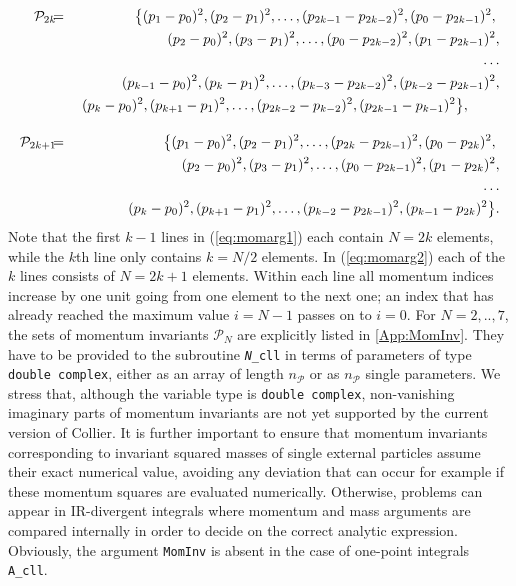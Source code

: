\documentclass[preprint,sort&compress,12pt]{elsarticle}
\def\refeq#1{\mbox{(\ref{#1})}}
\newcommand{\collier}{{\sc Collier}}
\begin{document}
\begin{eqnarray}
  \mathcal{P}_{2k}\!\!\!&=&\!\!\!\left\{ (p_1-p_0)^2,(p_2-p_1)^2,\ldots,(p_{2k-1}-p_{2k-2})^2,
                                     (p_0-p_{2k-1})^2,\right.\nonumber\\
               &&\,(p_2-p_0)^2,(p_3-p_1)^2,\ldots,(p_0-p_{2k-2})^2,(p_1-p_{2k-1})^2,\nonumber\\
               &&\;\;\;\ldots\nonumber\\
               &&\,(p_{k-1}-p_0)^2,(p_k-p_1)^2,\ldots,(p_{k-3}-p_{2k-2})^2,(p_{k-2}-p_{2k-1})^2,\nonumber\\               
               &&\,\left.(p_{k}-p_0)^2,(p_{k+1}-p_1)^2,\ldots,(p_{2k-2}-p_{k-2})^2,(p_{2k-1}-p_{k-1})^2\right\}\!,\hspace{0.8cm}\label{eq:momarg1}\\[1em]
  \mathcal{P}_{2k+1}\!\!\!&=&\!\!\!\left\{ (p_1-p_0)^2,(p_2-p_1)^2,\ldots,(p_{2k}-p_{2k-1})^2,
                                     (p_0-p_{2k})^2,\right.\nonumber\\
               &&\,(p_2-p_0)^2,(p_3-p_1)^2,\ldots,(p_0-p_{2k-1})^2,(p_1-p_{2k})^2,\nonumber\\
               &&\;\;\;\ldots\nonumber\\
               &&\,\left.(p_{k}-p_0)^2,(p_{k+1}-p_1)^2,\ldots,(p_{k-2}-p_{2k-1})^2,
                 (p_{k-1}-p_{2k})^2\right\}\!.\label{eq:momarg2}
\end{eqnarray}
Note that the first $k-1$ lines in \refeq{eq:momarg1} each
contain $N=2k$ elements, while the $k$th line only contains $k=N/2$ elements. In \refeq{eq:momarg2} 
each of the $k$ lines consists of $N=2k+1$ elements. Within each line all momentum indices increase by one unit going from one element to the next one; 
an index that has already reached the maximum value $i=N-1$ passes on to $i=0$. For $N=2,..,7$, the sets of momentum invariants $\mathcal{P}_N$ are explicitly
listed in \ref{App:MomInv}. They have to be provided to the subroutine
{\tt {\it N}\_cll} in terms of parameters of type {\tt double complex}, either as an array of length $n_\mathcal{P}$ or as $n_\mathcal{P}$ single 
parameters. We stress that, although the variable type is {\tt double complex}, non-vanishing imaginary parts of momentum invariants are not yet supported 
by the current version of {\collier}. It is further important to ensure that momentum invariants corresponding to invariant squared masses of single 
external particles assume their exact numerical value, avoiding any deviation that can occur for example if these momentum squares are evaluated numerically. 
Otherwise, problems can appear in IR-divergent integrals where momentum and mass arguments are compared internally in order to decide 
on the correct
analytic expression. Obviously, the argument {\tt MomInv} is absent in the case of one-point integrals {\tt A\_cll}.
\end{document}
